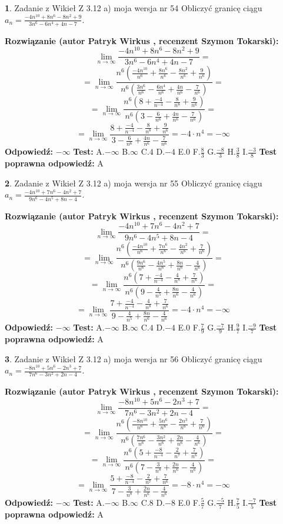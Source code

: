 \documentclass[12pt, a4paper]{article}
\theoremstyle{definition} %
\newtheorem{zad}{}
\newcommand{\zadStart}[1]{\begin{zad}#1\newline}
\newcommand{\zadStop}{\end{zad}}
\newcommand{\rozwStart}[2]{\noindent \textbf{Rozwiązanie (autor #1 , recenzent #2): }\newline}
\newcommand{\rozwStop}{\newline}
\newcommand{\odpStart}{\noindent \textbf{Odpowiedź:}\newline}
\newcommand{\odpStop}{\newline}
\newcommand{\testStart}{\noindent \textbf{Test:}\newline}
\newcommand{\testStop}{\newline}
\newcommand{\kluczStart}{\noindent \textbf{Test poprawna odpowiedź:}\newline}
\newcommand{\kluczStop}{\newline}
\begin{document}
\zadStart{Zadanie z Wikieł Z 3.12 a) moja wersja nr 54}
Obliczyć granicę ciągu $a_{n}=\frac{-4n^{10}+8n^{6}-8n^{2}+9}{3n^{6}-6n^{4}+4n-7}$.
\zadStop
\rozwStart{Patryk Wirkus}{Szymon Tokarski}
$$\lim\limits_{n\to\infty}\frac{-4n^{10}+8n^{6}-8n^{2}+9}{3n^{6}-6n^{4}+4n-7}=$$
$$=\lim\limits_{n\to\infty}\frac{n^{6}\left(\frac{-4n^{10}}{n^{6}}+\frac{8n^{6}}{n^{6}}-\frac{8n^{2}}{n^{6}}+\frac{9}{n^{6}}\right)}{n^{6}\left(\frac{3n^{6}}{n^{6}}-\frac{6n^{4}}{n^{6}}+\frac{4n}{n^{6}}-\frac{7}{n^{6}}\right)}=$$
$$=\lim\limits_{n\to\infty}\frac{n^{6}\left(8+\frac{-4}{n^{-4}}-\frac{8}{n^{8}}+\frac{9}{n^{6}}\right)}
{n^{6}\left(3-\frac{6}{n^{6}}+\frac{4n}{n^{6}}-\frac{7}{n^{6}}\right)}=$$
$$=\lim\limits_{n\to\infty}\frac{8+\frac{-4}{n^{-4}}-\frac{8}{n^{8}}+\frac{9}{n^{6}}}{3-\frac{6}{n^{6}}+\frac{4n}{n^{6}}-\frac{7}{n^{6}}}=-4\cdot n^{4} = -\infty$$
\rozwStop
\odpStart
$-\infty$
\odpStop
\testStart
A.$-\infty$
B.$\infty$
C.$4$
D.$-4$
E.$0$
F.$\frac{8}{3}$
G.$\frac{-8}{3}$
H.$\frac{3}{8}$
I.$\frac{-3}{8}$
\testStop
\kluczStart
A
\kluczStop



\zadStart{Zadanie z Wikieł Z 3.12 a) moja wersja nr 55}
Obliczyć granicę ciągu $a_{n}=\frac{-4n^{10}+7n^{6}-4n^{2}+7}{9n^{6}-4n^{5}+8n-4}$.
\zadStop
\rozwStart{Patryk Wirkus}{Szymon Tokarski}
$$\lim\limits_{n\to\infty}\frac{-4n^{10}+7n^{6}-4n^{2}+7}{9n^{6}-4n^{5}+8n-4}=$$
$$=\lim\limits_{n\to\infty}\frac{n^{6}\left(\frac{-4n^{10}}{n^{6}}+\frac{7n^{6}}{n^{6}}-\frac{4n^{2}}{n^{6}}+\frac{7}{n^{6}}\right)}{n^{6}\left(\frac{9n^{6}}{n^{6}}-\frac{4n^{5}}{n^{6}}+\frac{8n}{n^{6}}-\frac{4}{n^{6}}\right)}=$$
$$=\lim\limits_{n\to\infty}\frac{n^{6}\left(7+\frac{-4}{n^{-4}}-\frac{4}{n^{8}}+\frac{7}{n^{6}}\right)}
{n^{6}\left(9-\frac{4}{n^{5}}+\frac{8n}{n^{6}}-\frac{4}{n^{6}}\right)}=$$
$$=\lim\limits_{n\to\infty}\frac{7+\frac{-4}{n^{-4}}-\frac{4}{n^{8}}+\frac{7}{n^{6}}}{9-\frac{4}{n^{5}}+\frac{8n}{n^{6}}-\frac{4}{n^{6}}}=-4\cdot n^{4} = -\infty$$
\rozwStop
\odpStart
$-\infty$
\odpStop
\testStart
A.$-\infty$
B.$\infty$
C.$4$
D.$-4$
E.$0$
F.$\frac{7}{9}$
G.$\frac{-7}{9}$
H.$\frac{9}{7}$
I.$\frac{-9}{7}$
\testStop
\kluczStart
A
\kluczStop



\zadStart{Zadanie z Wikieł Z 3.12 a) moja wersja nr 56}
Obliczyć granicę ciągu $a_{n}=\frac{-8n^{10}+5n^{6}-2n^{3}+7}{7n^{6}-3n^{2}+2n-4}$.
\zadStop
\rozwStart{Patryk Wirkus}{Szymon Tokarski}
$$\lim\limits_{n\to\infty}\frac{-8n^{10}+5n^{6}-2n^{3}+7}{7n^{6}-3n^{2}+2n-4}=$$
$$=\lim\limits_{n\to\infty}\frac{n^{6}\left(\frac{-8n^{10}}{n^{6}}+\frac{5n^{6}}{n^{6}}-\frac{2n^{3}}{n^{6}}+\frac{7}{n^{6}}\right)}{n^{6}\left(\frac{7n^{6}}{n^{6}}-\frac{3n^{2}}{n^{6}}+\frac{2n}{n^{6}}-\frac{4}{n^{6}}\right)}=$$
$$=\lim\limits_{n\to\infty}\frac{n^{6}\left(5+\frac{-8}{n^{-4}}-\frac{2}{n^{7}}+\frac{7}{n^{6}}\right)}
{n^{6}\left(7-\frac{3}{n^{8}}+\frac{2n}{n^{6}}-\frac{4}{n^{6}}\right)}=$$
$$=\lim\limits_{n\to\infty}\frac{5+\frac{-8}{n^{-4}}-\frac{2}{n^{7}}+\frac{7}{n^{6}}}{7-\frac{3}{n^{8}}+\frac{2n}{n^{6}}-\frac{4}{n^{6}}}=-8\cdot n^{4} = -\infty$$
\rozwStop
\odpStart
$-\infty$
\odpStop
\testStart
A.$-\infty$
B.$\infty$
C.$8$
D.$-8$
E.$0$
F.$\frac{5}{7}$
G.$\frac{-5}{7}$
H.$\frac{7}{5}$
I.$\frac{-7}{5}$
\testStop
\kluczStart
A
\kluczStop
\end{document}

